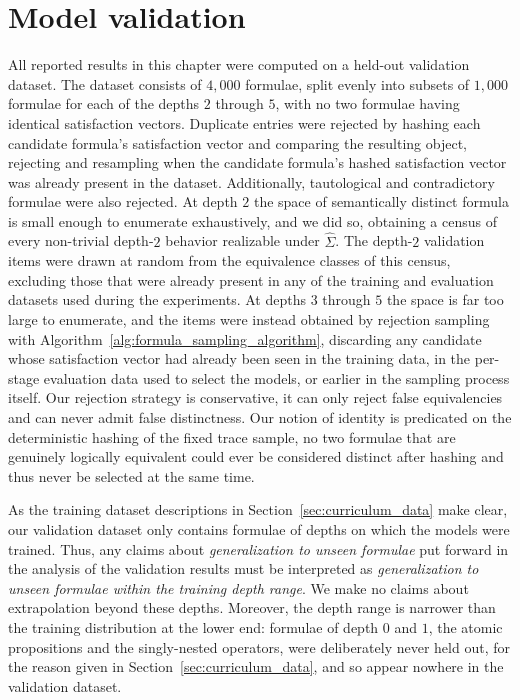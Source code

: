 \documentclass[titlepage,a4paper,11pt]{report}
\DeclareRobustCommand{\RSnew}[1]{{\color{blue!65!black}#1}}
\begin{document}
    \section{Model validation}\label{sec:model_validation}
    All reported results in this chapter were computed on a held-out validation dataset. The dataset consists of $4{,}000$ formulae, split evenly into subsets of $1{,}000$ formulae for each of the depths $2$ through $5$, with no two formulae having identical satisfaction vectors. Duplicate entries were rejected by hashing each candidate formula's satisfaction vector and comparing the resulting object, rejecting and resampling when the candidate formula's hashed satisfaction vector was already present in the dataset. Additionally, tautological and contradictory formulae were also rejected. At depth $2$ the space of semantically distinct formula is small enough to enumerate exhaustively, and we did so, obtaining a census of every non-trivial depth-$2$ behavior realizable under $\widehat \Sigma$. The depth-$2$ validation items were drawn at random from the equivalence classes of this census, excluding those that were already present in any of the training and evaluation datasets used during the experiments. At depths $3$ through $5$ the space is far too large to enumerate, and the items were instead obtained by rejection sampling with Algorithm~\ref{alg:formula_sampling_algorithm}, discarding any candidate whose satisfaction vector had already been seen in the training data, in the per-stage evaluation data used to select the models, or earlier in the sampling process itself. Our rejection strategy is conservative, it can only reject false equivalencies and can never admit false distinctness. Our notion of identity is predicated on the deterministic hashing of the fixed trace sample, no two formulae that are genuinely logically equivalent could ever be considered distinct after hashing and thus never be selected at the same time. 
    
    As the training dataset descriptions \RSnew{in Section~\ref{sec:curriculum_data} make} clear, our validation dataset only contains formulae of depths on which the models were trained. Thus, any claims about \emph{generalization to unseen formulae} put forward in the analysis of the validation results must be interpreted as \emph{generalization to unseen formulae within the training depth range}. We make no claims about extrapolation beyond these depths. Moreover, the depth range is narrower than the training distribution at the lower end: formulae of depth $0$ and $1$, the atomic propositions and the singly-nested operators, were deliberately never held out, for the reason given in Section~\ref{sec:curriculum_data}, and so appear nowhere in the validation dataset.
    
\end{document}

